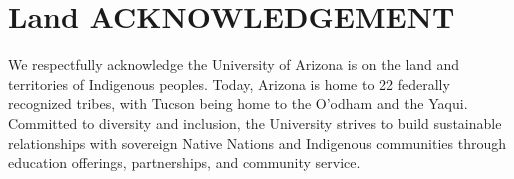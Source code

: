 \chapter{Land ACKNOWLEDGEMENT}
We respectfully acknowledge the University of Arizona is on the land and territories of Indigenous peoples.
Today, Arizona is home to 22 federally recognized tribes, with Tucson being home to the O'odham and the Yaqui.
Committed to diversity and inclusion, the University strives to build sustainable relationships with sovereign Native Nations and Indigenous communities through education offerings, partnerships, and community service.
